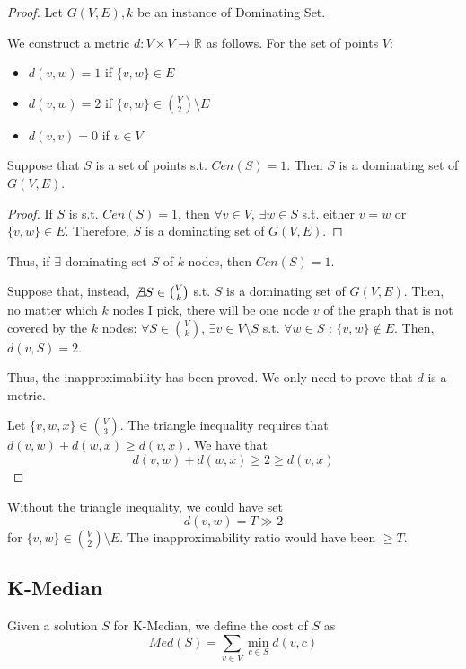     \begin{proof}
        Let $G(V,E),k$ be an instance of Dominating Set.

        We construct a metric $d : V \times V \rightarrow \mathbb{R}$ as follows.
        For the set of points $V$:
        \begin{itemize}
            \item $d(v,w)=1$ if $\{v,w\} \in E$
            \item $d(v,w)=2$ if $\{v,w\} \in \binom{V}{2} \setminus E$
            \item $d(v,v)=0$ if $v \in V$
        \end{itemize}

        \begin{claim}
            Suppose that $S$ is a set of points s.t. $Cen(S)=1$.
            Then $S$ is a dominating set of $G(V,E)$.
        \end{claim}
        \begin{proof}
            If $S$ is s.t. $Cen(S)=1$, then $\forall v \in V$, $\exists w \in S$ s.t. either $v=w$ or $\{v,w\} \in E$. Therefore, $S$ is a dominating set of $G(V,E)$.
        \end{proof}

        Thus, if $\exists$ dominating set $S$ of $k$ nodes, then $Cen(S)=1$.

        Suppose that, instead, $\not\exists S \in \binom{V}{k}$ s.t. $S$ is a dominating set of $G(V,E)$.
        Then, no matter which $k$ nodes I pick, there will be one node $v$ of the graph that is not covered by the $k$ nodes: $\forall S \in \binom{V}{k}$, $\exists v \in V \setminus S$ s.t. $\forall w \in S$ : $\{v,w\} \not\in E$.
        Then, $d(v,S) = 2$.

        Thus, the inapproximability has been proved.
        We only need to prove that $d$ is a metric.

        Let $\{v,w,x\} \in \binom{V}{3}$.
        The triangle inequality requires that $d(v,w) + d(w,x) \geq d(v,x)$.
        We have that
        \[ d(v,w) + d(w,x) \geq 2 \geq d(v,x) \]
    \end{proof}

    Without the triangle inequality, we could have set
    \[ d(v,w) = T \gg 2 \]
    for $\{ v,w \} \in \binom{V}{2} \setminus E$.
    The inapproximability ratio would have been $\geq T$.


\subsection{K-Median}
    Given a solution $S$ for K-Median, we define the cost of $S$ as
    \[ Med(S) = \sum_{v \in V} \min_{c \in S} d(v,c) \]

